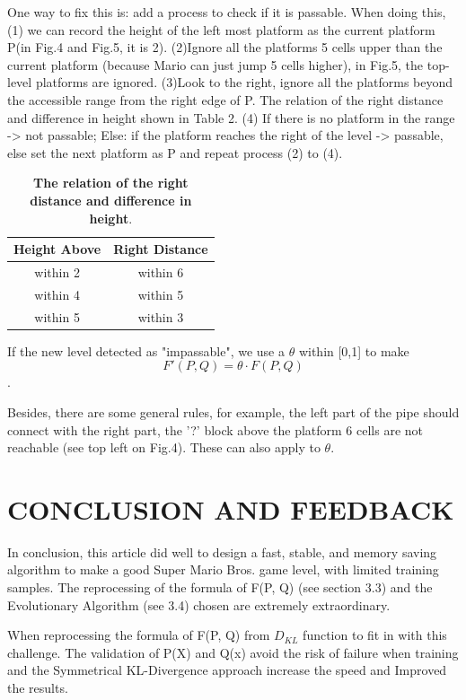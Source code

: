 \documentclass[runningheads]{llncs}
\begin{document}
One way to fix this is: add a process to check if it is passable. When doing this,(1) we can record the height of the left most platform as the current platform P(in Fig.4 and Fig.5, it is 2). (2)Ignore all the platforms 5 cells upper than the current platform (because Mario can just jump 5 cells higher), in Fig.5, the top-level platforms are ignored. (3)Look to the right, ignore all the platforms beyond the accessible range from the right edge of P. The relation of the right distance and difference in height shown in Table 2. (4) If there is no platform in the range -> not passable; Else: if the platform reaches the right of the level -> passable, else set the next platform as P and repeat process (2) to (4).

\begin{table}[h!]
\centering
\begin{tabular}{|c| c|} 
 \hline
 Height Above & Right Distance \\
 \hline
 within 2 & within 6  \\ 
 within 4 & within 5 \\
 within 5 & within 3 \\ [1ex] 
  \hline
\end{tabular}
\caption{\textbf{The relation of the right distance and difference in height}.}
\label{table2}
\end{table}

If the new level detected as "impassable", we use a \(\theta\)  within [0,1] to make \[F'(P,Q) = \theta \cdot F(P,Q)\].

Besides, there are some general rules, for example, the left part of the pipe should connect with the right part, the '?' block above the platform 6 cells are not reachable (see top left on Fig.4). These can also apply to \(\theta\).


\section{CONCLUSION AND FEEDBACK}
In conclusion, this article did well to design a fast, stable, and memory saving algorithm to make a good Super Mario Bros. game level, with limited training samples. The reprocessing of the formula of F(P, Q) (see section 3.3) and the Evolutionary Algorithm (see 3.4) chosen are extremely extraordinary. 

When reprocessing the formula of F(P, Q) from \(D_{KL}\) function to fit in with this challenge. The validation of P(X) and Q(x) avoid the risk of failure when training and the Symmetrical KL-Divergence approach increase the speed and Improved the results.
\end{document}
